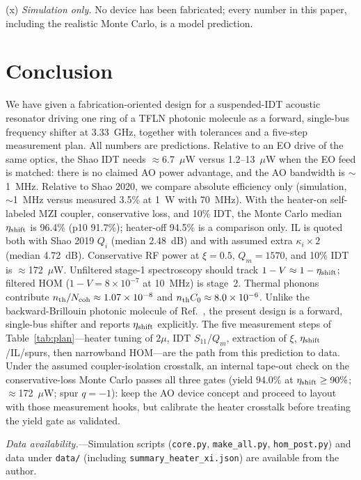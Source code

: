 \documentclass[aps,prapplied,reprint,superscriptaddress,amsmath,amssymb,floatfix]{revtex4-2}
\newcommand{\etash}{\eta_{\rm shift}}
\begin{document}
(x) \emph{Simulation only.} No device has been fabricated; every number in this paper, including the realistic Monte Carlo, is a model prediction.

\section{Conclusion}
We have given a fabrication-oriented design for a suspended-IDT acoustic resonator driving one ring of a TFLN photonic molecule as a forward, single-bus frequency shifter at 3.33~GHz, together with tolerances and a five-step measurement plan. All numbers are predictions. Relative to an EO drive of the same optics, the Shao IDT needs $\approx$6.7~$\mu$W versus 1.2--13~$\mu$W when the EO feed is matched: there is no claimed AO power advantage, and the AO bandwidth is $\sim$1~MHz. Relative to Shao 2020, we compare absolute efficiency only (simulation, $\sim$1~MHz versus measured 3.5\% at 1~W with 70~MHz). With the heater-on self-labeled MZI coupler, conservative loss, and 10\% IDT, the Monte Carlo median $\etash$ is 96.4\% (p10 91.7\%); heater-off 94.5\% is a comparison only. IL is quoted both with Shao 2019 $Q_i$ (median 2.48~dB) and with assumed extra $\kappa_i\times2$ (median 4.72~dB). Conservative RF power at $\xi=0.5$, $Q_m=1570$, and 10\% IDT is $\approx$172~$\mu$W. Unfiltered stage-1 spectroscopy should track $1-V\approx1-\etash$; filtered HOM ($1-V=8\times10^{-7}$ at 10~MHz) is stage~2. Thermal phonons contribute $n_{\rm th}/N_{\rm coh}\approx1.07\times10^{-8}$ and $n_{\rm th}C_0\approx8.0\times10^{-6}$. Unlike the backward-Brillouin photonic molecule of Ref.~\cite{Zhu2025ao}, the present design is a forward, single-bus shifter and reports $\etash$ explicitly. The five measurement steps of Table~\ref{tab:plan}---heater tuning of $2\mu$, IDT $S_{11}$/$Q_m$, extraction of $\xi$, $\etash$/IL/spurs, then narrowband HOM---are the path from this prediction to data. Under the assumed coupler-isolation crosstalk, an internal tape-out check on the conservative-loss Monte Carlo passes all three gates (yield 94.0\% at $\etash\ge90\%$; $\approx$172~$\mu$W; spur $q=-1$): keep the AO device concept and proceed to layout with those measurement hooks, but calibrate the heater crosstalk before treating the yield gate as validated.

\emph{Data availability.}---Simulation scripts (\texttt{core.py}, \texttt{make\_all.py}, \texttt{hom\_post.py}) and data under \texttt{data/} (including \texttt{summary\_heater\_xi.json}) are available from the author.


\end{document}
